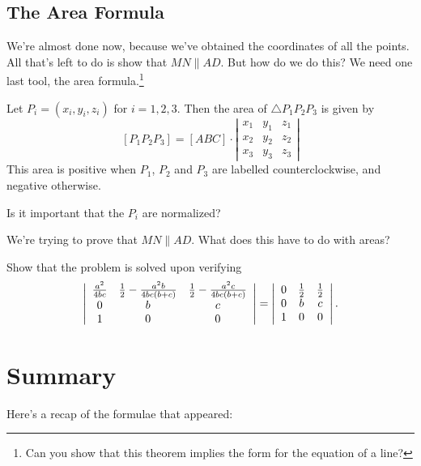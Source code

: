 \documentclass{scrartcl}
\begin{document}
\subsection{The Area Formula}
We're almost done now, because we've obtained the coordinates of all the points.  All that's left to do is show that $MN \parallel AD$.  But how do we do this?  We need one last tool, the area formula.\footnote{Can you show that this theorem implies the form for the equation of a line?}
\begin{theorem}
  Let $P_i = \left( x_i, y_i, z_i \right)$ for $i=1,2,3$.  Then the area of $\triangle P_1P_2P_3$ is given by
  \[ [P_1P_2P_3] = [ABC] \cdot \left| \begin{array}{ccc} x_1 & y_1 & z_1 \\ x_2 & y_2 & z_2 \\ x_3 & y_3 & z_3 \end{array} \right| \]
  This area is positive when $P_1$, $P_2$ and $P_3$ are labelled counterclockwise, and negative otherwise.
  \label{thm:area}
\end{theorem}
\begin{ques*}
  Is it important that the $P_i$ are normalized?
\end{ques*}
\begin{ques*}
  We're trying to prove that $MN \parallel AD$.  What does this have to do with areas?
\end{ques*}
\begin{ques*}
  Show that the problem is solved upon verifying \[
  \left|
  \begin{array}{ccc}
    \frac{a^2}{4bc} & \frac{1}{2} - \frac{a^2b}{4bc(b+c)} & \frac{1}{2}-\frac{a^2c}{4bc(b+c)} \\
    0 & b & c \\
    1 & 0 & 0
  \end{array}
  \right|
  =
  \left|
  \begin{array}{ccc}
    0 & \frac{1}{2} & \frac{1}{2} \\
    0 & b & c \\
    1 & 0 & 0
  \end{array}
  \right|.
  \]
\end{ques*}

\section{Summary}
Here's a recap of the formulae that appeared:
\end{document}
